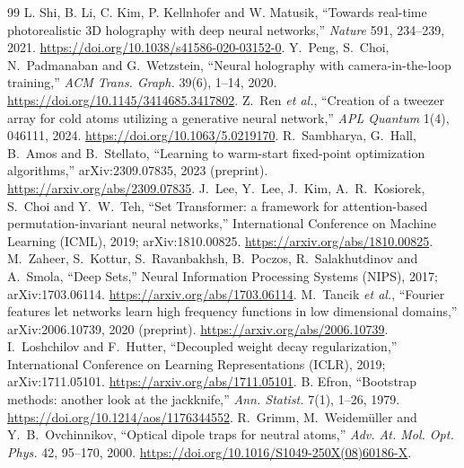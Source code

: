 \begin{thebibliography}{99}
 L. Shi, B. Li, C. Kim, P. Kellnhofer and W. Matusik, ``Towards real-time photorealistic 3D holography with deep neural networks,'' \emph{Nature} 591, 234--239, 2021. \url{https://doi.org/10.1038/s41586-020-03152-0}.
 Y.~Peng, S.~Choi, N.~Padmanaban and G.~Wetzstein, ``Neural holography with camera-in-the-loop training,'' \emph{ACM Trans. Graph.} 39(6), 1--14, 2020. \url{https://doi.org/10.1145/3414685.3417802}.
 Z.~Ren \emph{et al.}, ``Creation of a tweezer array for cold atoms utilizing a generative neural network,'' \emph{APL Quantum} 1(4), 046111, 2024. \url{https://doi.org/10.1063/5.0219170}.
 R.~Sambharya, G.~Hall, B.~Amos and B.~Stellato, ``Learning to warm-start fixed-point optimization algorithms,'' arXiv:2309.07835, 2023 (preprint). \url{https://arxiv.org/abs/2309.07835}.
 J.~Lee, Y.~Lee, J.~Kim, A.~R.~Kosiorek, S.~Choi and Y.~W.~Teh, ``Set Transformer: a framework for attention-based permutation-invariant neural networks,'' International Conference on Machine Learning (ICML), 2019; arXiv:1810.00825. \url{https://arxiv.org/abs/1810.00825}.
 M.~Zaheer, S.~Kottur, S.~Ravanbakhsh, B.~Poczos, R.~Salakhutdinov and A.~Smola, ``Deep Sets,'' Neural Information Processing Systems (NIPS), 2017; arXiv:1703.06114. \url{https://arxiv.org/abs/1703.06114}.
 M.~Tancik \emph{et al.}, ``Fourier features let networks learn high frequency functions in low dimensional domains,'' arXiv:2006.10739, 2020 (preprint). \url{https://arxiv.org/abs/2006.10739}.
 I.~Loshchilov and F.~Hutter, ``Decoupled weight decay regularization,'' International Conference on Learning Representations (ICLR), 2019; arXiv:1711.05101. \url{https://arxiv.org/abs/1711.05101}.
 B. Efron, ``Bootstrap methods: another look at the jackknife,'' \emph{Ann. Statist.} 7(1), 1--26, 1979. \url{https://doi.org/10.1214/aos/1176344552}.
 R.~Grimm, M.~Weidem\"uller and Y.~B.~Ovchinnikov, ``Optical dipole traps for neutral atoms,'' \emph{Adv. At. Mol. Opt. Phys.} 42, 95--170, 2000. \url{https://doi.org/10.1016/S1049-250X(08)60186-X}.
\end{thebibliography}
